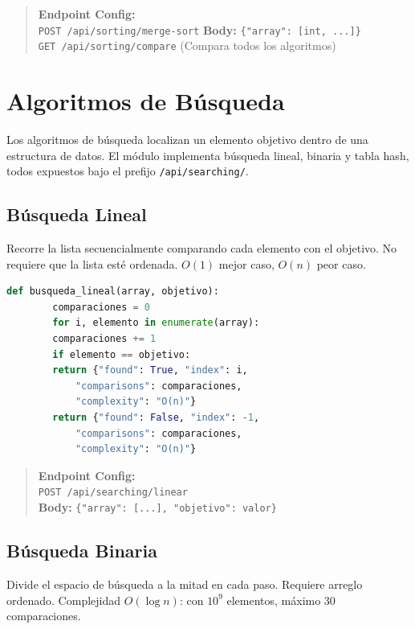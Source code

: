 \documentclass[12pt, letterpaper]{article}
\begin{document}
	\begin{quote}
		\textbf{Endpoint Config:} \\
		\texttt{POST /api/sorting/merge-sort} \quad \textbf{Body:} \texttt{\{"array": [int, ...]\}} \\
		\texttt{GET  /api/sorting/compare} \quad (Compara todos los algoritmos)
	\end{quote}
	
	
	\section{Algoritmos de Búsqueda}
	Los algoritmos de búsqueda localizan un elemento objetivo dentro de una estructura de datos. El módulo implementa búsqueda lineal, binaria y tabla hash, todos expuestos bajo el prefijo \texttt{/api/searching/}.
	
	\subsection{Búsqueda Lineal}
	Recorre la lista secuencialmente comparando cada elemento con el objetivo. No requiere que la lista esté ordenada. $O(1)$ mejor caso, $O(n)$ peor caso.
	
	\begin{lstlisting}[language=Python, caption={Implementacion de Busqueda Lineal}]
		def busqueda_lineal(array, objetivo):
		comparaciones = 0
		for i, elemento in enumerate(array):
		comparaciones += 1
		if elemento == objetivo:
		return {"found": True, "index": i,
			"comparisons": comparaciones,
			"complexity": "O(n)"}
		return {"found": False, "index": -1,
			"comparisons": comparaciones,
			"complexity": "O(n)"}
	\end{lstlisting}
	
	\begin{quote}
		\textbf{Endpoint Config:} \\
		\texttt{POST /api/searching/linear} \\
		\textbf{Body:} \texttt{\{"array": [...], "objetivo": valor\}}
	\end{quote}
	
	\subsection{Búsqueda Binaria}
	Divide el espacio de búsqueda a la mitad en cada paso. Requiere arreglo ordenado. Complejidad $O(\log n)$: con $10^9$ elementos, máximo 30 comparaciones.
	
\end{document}
